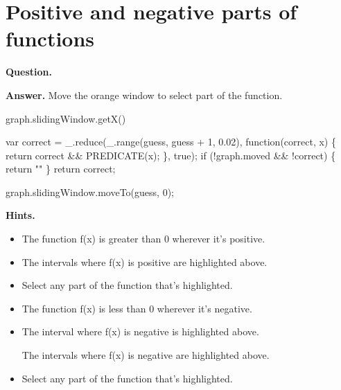 \documentclass{article}
\begin{document}
\section*{Positive and negative parts of functions}
\textbf{Question.} 

\textbf{Answer.} Move the orange window to select part of the function.
        
        
            graph.slidingWindow.getX()
        
        
            var correct = \_.reduce(\_.range(guess, guess + 1, 0.02), function(correct, x) \{
                return correct \&\& PREDICATE(x);
            \}, true);
            if (!graph.moved \&\& !correct) \{
                return ""
            \}
            return correct;
        
        
            graph.slidingWindow.moveTo(guess, 0);

\textbf{Hints.}
\begin{itemize}
  \item The function f(x) is greater than 0
                    wherever it's positive.
  \item The intervals
                        where f(x) is positive
                        are
                        highlighted above.
  \item Select any part of the function that's highlighted.
  \item The function f(x) is less than 0
                    wherever it's negative.
  \item The interval
                        where f(x) is negative
                        is
                        highlighted above.
                    
                        The intervals
                        where f(x) is negative
                        are
                        highlighted above.
  \item Select any part of the function that's highlighted.
\end{itemize}
\end{document}
